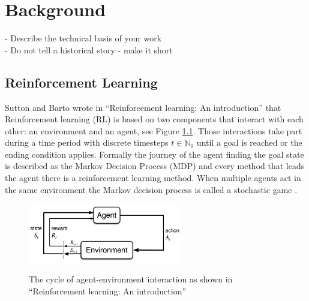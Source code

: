 \chapter{Background}\label{sec:Background}
- Describe the technical basis of your work \\
- Do not tell a historical story - make it short

\section{Reinforcement Learning}
Sutton and Barto wrote in ``Reinforcement learning: An introduction''\cite{suba18} that Reinforcement learning (RL) is based on two components that interact with each other: an environment and an agent, see Figure \ref{fig:rl_cycle}. Those interactions take part during a time period with discrete timesteps $t\in\mathbb{N}_0$ until a goal is reached or the ending condition applies. Formally the journey of the agent finding the goal state is described as the Markov Decision Process (MDP) and every method that leads the agent there is a reinforcement learning method. When multiple agents act in the same environment the Markov decision process is called a stochastic game \cite{buba10}.
\begin{figure}[hpbt]
    \centering
    \includegraphics[width=0.6\textwidth]{pictures/RLInteractionSB}\\
    \caption[Reinforcement Learning Cycle]{The cycle of agent-environment interaction as
        shown in ``Reinforcement learning: An introduction''\cite{suba18}}\label{fig:rl_cycle}
\end{figure}

